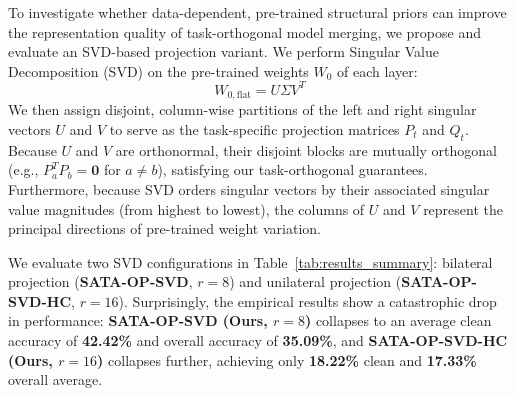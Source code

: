 \documentclass{article}
\theoremstyle{plain}
\theoremstyle{definition}
\theoremstyle{remark}
\begin{document}
To investigate whether data-dependent, pre-trained structural priors can improve the representation quality of task-orthogonal model merging, we propose and evaluate an SVD-based projection variant. We perform Singular Value Decomposition (SVD) on the pre-trained weights $W_0$ of each layer:
\begin{equation}
    W_{0,\text{flat}} = U \Sigma V^T
\end{equation}
We then assign disjoint, column-wise partitions of the left and right singular vectors $U$ and $V$ to serve as the task-specific projection matrices $P_t$ and $Q_t$. Because $U$ and $V$ are orthonormal, their disjoint blocks are mutually orthogonal (e.g., $P_a^T P_b = \mathbf{0}$ for $a \neq b$), satisfying our task-orthogonal guarantees. Furthermore, because SVD orders singular vectors by their associated singular value magnitudes (from highest to lowest), the columns of $U$ and $V$ represent the principal directions of pre-trained weight variation.

We evaluate two SVD configurations in Table~\ref{tab:results_summary}: bilateral projection (\textbf{SATA-OP-SVD}, $r=8$) and unilateral projection (\textbf{SATA-OP-SVD-HC}, $r=16$). Surprisingly, the empirical results show a catastrophic drop in performance: \textbf{SATA-OP-SVD (Ours, $r=8$)} collapses to an average clean accuracy of \textbf{42.42\%} and overall accuracy of \textbf{35.09\%}, and \textbf{SATA-OP-SVD-HC (Ours, $r=16$)} collapses further, achieving only \textbf{18.22\%} clean and \textbf{17.33\%} overall average.
\end{document}
